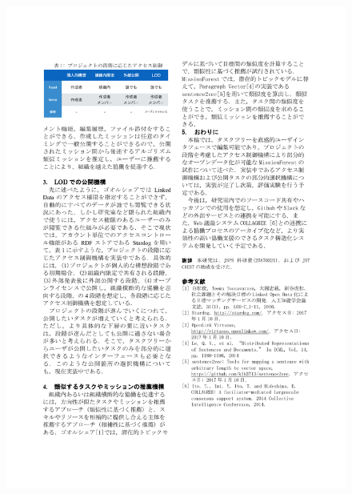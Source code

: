 \begin{figure}[ht]
    \begin{center}
        \includegraphics[width=1.0\linewidth]{assets/pdf/ipsj2017_2.pdf}
    \end{center}
\end{figure}
\clearpage
